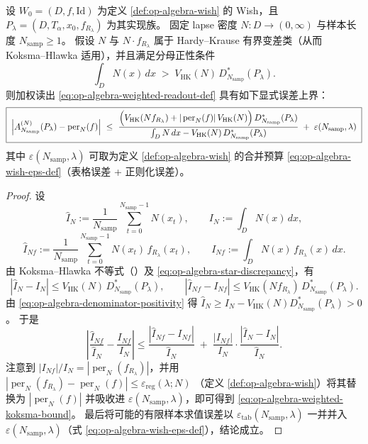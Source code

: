 \begin{theorem}\label{thm:op-algebra-lapse-weighted-wish-koksma}
设 \(W_0=(D,f,\mathrm{Id})\) 为定义 \ref{def:op-algebra-wish} 的 Wish，且 \(P_\lambda=(D,T_\alpha,x_0,f_{R_\lambda})\) 为其实现族。
固定 lapse 密度 \(N:D\to(0,\infty)\) 与样本长度 \(N_{\mathrm{samp}}\ge 1\)。
假设 \(N\) 与 \(N\cdot f_{R_\lambda}\) 属于 Hardy--Krause 有界变差类（从而 Koksma--Hlawka 适用），并且满足分母正性条件
\begin{equation}\label{eq:op-algebra-denominator-positivity}
\int_D N(x)\,dx\;>\;V_{\mathrm{HK}}(N)\,D_{N_{\mathrm{samp}}}^{\ast}(P_\lambda).
\end{equation}
则加权读出 \eqref{eq:op-algebra-weighted-readout-def} 具有如下显式误差上界：
\begin{equation}\label{eq:op-algebra-weighted-koksma-bound}
\boxed{\;
\left|
A^{(N)}_{N_{\mathrm{samp}}}(P_\lambda)-\operatorname{per}_{N}(f)
\right|
\ \le\
\frac{\Bigl(V_{\mathrm{HK}}(N f_{R_\lambda})+|\operatorname{per}_{N}(f)|\,V_{\mathrm{HK}}(N)\Bigr)\,D_{N_{\mathrm{samp}}}^{\ast}(P_\lambda)}
{\int_D N\,dx- V_{\mathrm{HK}}(N)\,D_{N_{\mathrm{samp}}}^{\ast}(P_\lambda)}
\;+\;\varepsilon(N_{\mathrm{samp}},\lambda)\;}
\end{equation}
其中 \(\varepsilon(N_{\mathrm{samp}},\lambda)\) 可取为定义 \ref{def:op-algebra-wish} 的合并预算 \eqref{eq:op-algebra-wish-eps-def}（表格误差 + 正则化误差）。
\end{theorem}

\begin{proof}
设
\[
\widehat I_{N}:=\frac{1}{N_{\mathrm{samp}}}\sum_{t=0}^{N_{\mathrm{samp}}-1}N(x_t),\qquad
I_{N}:=\int_D N(x)\,dx,
\]
\[
\widehat I_{Nf}:=\frac{1}{N_{\mathrm{samp}}}\sum_{t=0}^{N_{\mathrm{samp}}-1}N(x_t)\,f_{R_\lambda}(x_t),\qquad
I_{Nf}:=\int_D N(x)\,f_{R_\lambda}(x)\,dx.
\]
由 Koksma--Hlawka 不等式（\cite{KuipersNiederreiter1974}）及 \eqref{eq:op-algebra-star-discrepancy}，有
\[
|\widehat I_{N}-I_{N}|\le V_{\mathrm{HK}}(N)\,D_{N_{\mathrm{samp}}}^{\ast}(P_\lambda),
\qquad
|\widehat I_{Nf}-I_{Nf}|\le V_{\mathrm{HK}}(N f_{R_\lambda})\,D_{N_{\mathrm{samp}}}^{\ast}(P_\lambda).
\]
由 \eqref{eq:op-algebra-denominator-positivity} 得 \(\widehat I_N\ge I_N- V_{\mathrm{HK}}(N)D_{N_{\mathrm{samp}}}^{\ast}(P_\lambda)>0\)。
于是
\[
\left|\frac{\widehat I_{Nf}}{\widehat I_{N}}-\frac{I_{Nf}}{I_{N}}\right|
\le
\frac{|\widehat I_{Nf}-I_{Nf}|}{\widehat I_N}
\;+\;
\frac{|I_{Nf}|}{I_N}\cdot\frac{|\widehat I_N-I_N|}{\widehat I_N}.
\]
注意到 \(|I_{Nf}|/I_N=|\operatorname{per}_N(f_{R_\lambda})|\)，并用
\(
|\operatorname{per}_N(f_{R_\lambda})-\operatorname{per}_N(f)|\le \varepsilon_{\mathrm{reg}}(\lambda;N)
\)
（定义 \ref{def:op-algebra-wish}）将其替换为 \(|\operatorname{per}_N(f)|\) 并吸收进 \(\varepsilon(N_{\mathrm{samp}},\lambda)\)，即可得到 \eqref{eq:op-algebra-weighted-koksma-bound}。
最后将可能的有限样本求值误差以 \(\varepsilon_{\mathrm{tab}}(N_{\mathrm{samp}},\lambda)\) 一并并入 \(\varepsilon(N_{\mathrm{samp}},\lambda)\)（式 \eqref{eq:op-algebra-wish-eps-def}），结论成立。
\end{proof}

